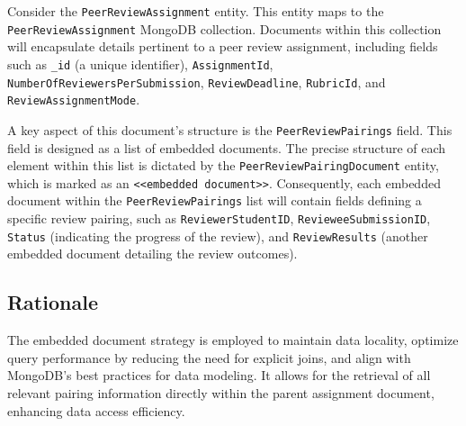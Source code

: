 \begin{justify}
    Consider the \texttt{PeerReviewAssignment} entity. This entity maps to the \texttt{PeerReviewAssignment} MongoDB collection. Documents within this collection will encapsulate details pertinent to a peer review assignment, including fields such as \texttt{\_id} (a unique identifier), \texttt{AssignmentId}, \texttt{NumberOfReviewersPerSubmission}, \texttt{ReviewDeadline}, \texttt{RubricId}, and \texttt{ReviewAssignmentMode}.

    A key aspect of this document's structure is the \texttt{PeerReviewPairings} field. This field is designed as a list of embedded documents. The precise structure of each element within this list is dictated by the \texttt{PeerReviewPairingDocument} entity, which is marked as an \texttt{<<embedded document>>}. Consequently, each embedded document within the \texttt{PeerReviewPairings} list will contain fields defining a specific review pairing, such as \texttt{ReviewerStudentID}, \texttt{RevieweeSubmissionID}, \texttt{Status} (indicating the progress of the review), and \texttt{ReviewResults} (another embedded document detailing the review outcomes).
\end{justify}

\subsection{Rationale}

\begin{justify}
    The embedded document strategy is employed to maintain data locality, optimize query performance by reducing the need for explicit joins, and align with MongoDB’s best practices for data modeling. It allows for the retrieval of all relevant pairing information directly within the parent assignment document, enhancing data access efficiency.
\end{justify}
